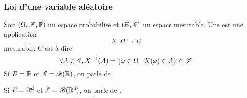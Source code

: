 \subsubsection{Loi d'une variable aléatoire}\label{subsubsec:2-1}

\begin{definition}
    Soit \((\Omega, \mathscr{F}, \mathbb{P})\) un espace probabilisé et \((E, \mathscr{E})\) un espace mesurable. 
    Une  est une application
    \begin{equation*}
        X\colon \Omega \to E
    \end{equation*}
    mesurable. C'est-à-dire 
    \begin{equation*}
        \forall A\in\mathscr{E}, X^{-1}(A) = \{\omega\in\Omega\mid X(\omega)\in A\}\in\mathscr{F}
    \end{equation*}
    Si \(E = \mathbb{R}\) et \(\mathscr{E} = \mathscr{B}(\mathbb{R})\), on parle de .

    Si \(E = \mathbb{R}^d\) et \(\mathscr{E} = \mathscr{B}(\mathbb{R}^d)\), on parle de .
\end{definition}


